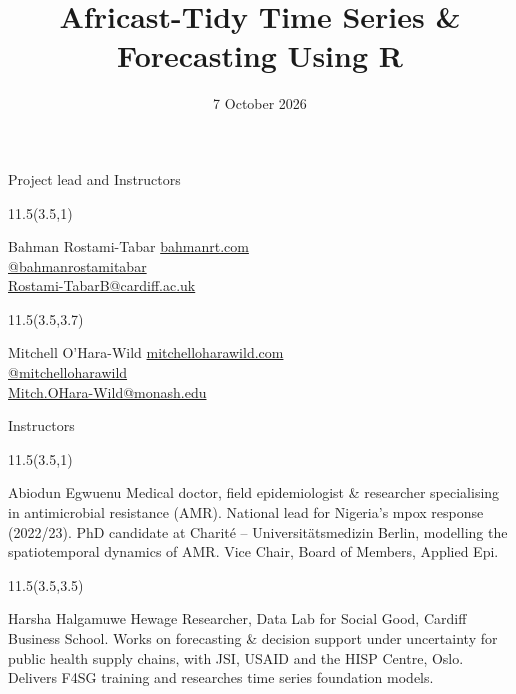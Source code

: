 \documentclass[
  14pt,
  ignorenonframetext,
  aspectratio=169,
]{beamer}
\title{\texorpdfstring{Africast-Tidy Time Series \& Forecasting Using
R}{Africast-Tidy Time Series \& Forecasting Using R}}
\author{}
\date{7 October 2026}
\begin{document}
\frame{\titlepage}


\begin{frame}{Project lead and Instructors}
\protect{}\label{project-lead-and-instructors}
\begin{textblock}{11.5}(3.5,1)
  \begin{alertblock}{Bahman Rostami-Tabar}
    {\small
      \href{https://www.bahmanrt.com/}{ bahmanrt.com}\\
      \href{https://github.com/bahmanrostamitabar}{ @bahmanrostamitabar}\\
      \href{mailto:Rostami-TabarB@cardiff.ac.uk}{ Rostami-TabarB@cardiff.ac.uk}
    }
  \end{alertblock}
\end{textblock}

\begin{textblock}{11.5}(3.5,3.7)
  \begin{alertblock}{Mitchell O'Hara-Wild}
    {\small
      \href{https://mitchelloharawild.com}{ mitchelloharawild.com}\\
      \href{https://github.com/mitchoharawild}{ @mitchelloharawild}\\
      \href{mailto:Mitch.OHara-Wild@monash.edu}{ Mitch.OHara-Wild@monash.edu}
    }
  \end{alertblock}
\end{textblock}
\end{frame}

\begin{frame}{Instructors}
\protect{}\label{instructors}
\begin{textblock}{11.5}(3.5,1)
  \begin{alertblock}{Abiodun Egwuenu}
    {\footnotesize Medical doctor, field epidemiologist \& researcher specialising in antimicrobial resistance (AMR). National lead for Nigeria's mpox response (2022/23). PhD candidate at Charit\'e -- Universit\"atsmedizin Berlin, modelling the spatiotemporal dynamics of AMR. Vice Chair, Board of Members, Applied Epi.}
  \end{alertblock}
\end{textblock}

\begin{textblock}{11.5}(3.5,3.5)
  \begin{alertblock}{Harsha Halgamuwe Hewage}
    {\footnotesize Researcher, Data Lab for Social Good, Cardiff Business School. Works on forecasting \& decision support under uncertainty for public health supply chains, with JSI, USAID and the HISP Centre, Oslo. Delivers F4SG training and researches time series foundation models.}
  \end{alertblock}
\end{textblock}
\end{frame}
\end{document}

